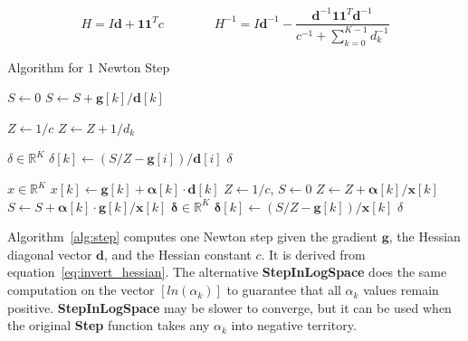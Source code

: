 \documentclass[twoside]{article}
\begin{document}
\begin{equation}
H=I\mathbf{d} + \mathbf{1}\mathbf{1}^Tc
\qquad \qquad
H^{-1}=I\mathbf{d}^{-1}-\frac{\mathbf{d}^{-1}\mathbf{1}\mathbf{1}^T\mathbf{d}^{-1}}{c^{-1}+\sum_{k=0}^{K-1}d_k^{-1}}
\label{eq:invert_hessian}
\end{equation}

\begin{algorithm}
  \caption{Algorithm for $1$ Newton Step}
  \begin{multicols}{2}
  \begin{algorithmic}
  \State $S \leftarrow 0$
    \State $S \leftarrow S + \mathbf{g}[k] / \mathbf{d}[k]$
  \EndFor

  \State $Z \leftarrow 1/c$
    \State $Z \leftarrow Z + 1 / d_k$
  \EndFor
  
  \State $\delta \in \mathbb{R}^{K}$
    \State $\delta[k] \gets (S/Z - \mathbf{g}[i]) / \mathbf{d}[i]$
  \EndFor
  \State \Return $\delta$
  \EndFunction
  \end{algorithmic}
  \columnbreak
  \begin{algorithmic}
  \State $x \in \mathbb{R}^{K}$
    \State $x[k] \gets \mathbf{g}[k]+\mathbf{\alpha}[k] \cdot \mathbf{d}[k]$
  \EndFor
  \State $Z \gets 1/c$, $S \gets 0$
    \State $Z \gets Z + \mathbf{\alpha}[k] / \mathbf{x}[k]$
    \State $S \gets S + \mathbf{\alpha}[k] \cdot \mathbf{g}[k]/\mathbf{x}[k]$
  \EndFor
  \State $\mathbf{\delta} \in \mathbb{R}^{K}$
    \State $\mathbf{\delta}[k] \gets (S / Z - \mathbf{g}[k]) / \mathbf{x}[k]$ \EndFor
  \State \Return $\delta$
  \EndFunction
  \end{algorithmic}
  \end{multicols}
  \label{alg:step}
\end{algorithm}

Algorithm~\ref{alg:step} computes one Newton step given the gradient $\mathbf{g}$, the Hessian diagonal vector $\mathbf{d}$, and the Hessian constant $c$. It is derived from equation~\eqref{eq:invert_hessian}. The alternative \textbf{StepInLogSpace} does the same computation on the vector \([ln(\alpha_k)]\) to guarantee that all \(\alpha_k\) values remain positive. \textbf{StepInLogSpace} may be slower to converge, but it can be used when the original \textbf{Step} function takes any \(\alpha_k\) into negative territory.
\end{document}
